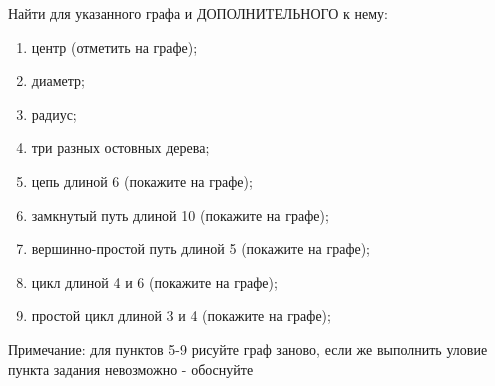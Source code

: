 \question
Найти для указанного графа и ДОПОЛНИТЕЛЬНОГО к нему:
\begin{enumerate}
\item  центр (отметить на графе);
\item  диаметр;
\item  радиус;
\item  три разных остовных дерева;
\item  цепь длиной 6 (покажите на графе);
\item  замкнутый путь длиной 10 (покажите на графе);
\item  вершинно-простой путь длиной 5 (покажите на графе);
\item  цикл длиной 4 и 6 (покажите на графе);
\item  простой цикл длиной 3 и 4 (покажите на графе);
\end{enumerate}
Примечание: для пунктов 5-9 рисуйте граф заново, если же выполнить уловие пункта задания невозможно  - обоснуйте 
\begin{figure}[h]

\begin{minipage}[h]{0.55\linewidth}
\end{minipage}
\begin{minipage}[h]{0.45\linewidth}
\end{minipage}
\end{figure}
